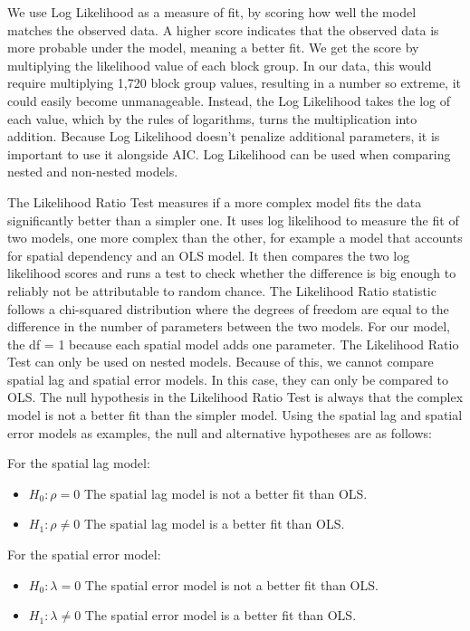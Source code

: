 \documentclass[
  12pt,
]{article}
\providecommand{\tightlist}{%
  \setlength{\itemsep}{0pt}\setlength{\parskip}{0pt}}
\begin{document}
We use Log Likelihood as a measure of fit, by scoring how well the model
matches the observed data. A higher score indicates that the observed
data is more probable under the model, meaning a better fit. We get the
score by multiplying the likelihood value of each block group. In our
data, this would require multiplying 1,720 block group values, resulting
in a number so extreme, it could easily become unmanageable. Instead,
the Log Likelihood takes the log of each value, which by the rules of
logarithms, turns the multiplication into addition. Because Log
Likelihood doesn't penalize additional parameters, it is important to
use it alongside AIC. Log Likelihood can be used when comparing nested
and non-nested models.

The Likelihood Ratio Test measures if a more complex model fits the data
significantly better than a simpler one. It uses log likelihood to
measure the fit of two models, one more complex than the other, for
example a model that accounts for spatial dependency and an OLS model.
It then compares the two log likelihood scores and runs a test to check
whether the difference is big enough to reliably not be attributable to
random chance. The Likelihood Ratio statistic follows a chi-squared
distribution where the degrees of freedom are equal to the difference in
the number of parameters between the two models. For our model, the df =
1 because each spatial model adds one parameter. The Likelihood Ratio
Test can only be used on nested models. Because of this, we cannot
compare spatial lag and spatial error models. In this case, they can
only be compared to OLS. The null hypothesis in the Likelihood Ratio
Test is always that the complex model is not a better fit than the
simpler model. Using the spatial lag and spatial error models as
examples, the null and alternative hypotheses are as follows:

For the spatial lag model:

\begin{itemize}
\tightlist
\item
  \(H_0: \rho = 0\) The spatial lag model is not a better fit than OLS.
\item
  \(H_1: \rho \neq 0\) The spatial lag model is a better fit than OLS.
\end{itemize}

For the spatial error model:

\begin{itemize}
\tightlist
\item
  \(H_0: \lambda = 0\) The spatial error model is not a better fit than
  OLS.
\item
  \(H_1: \lambda \neq 0\) The spatial error model is a better fit than
  OLS.
\end{itemize}
\end{document}
